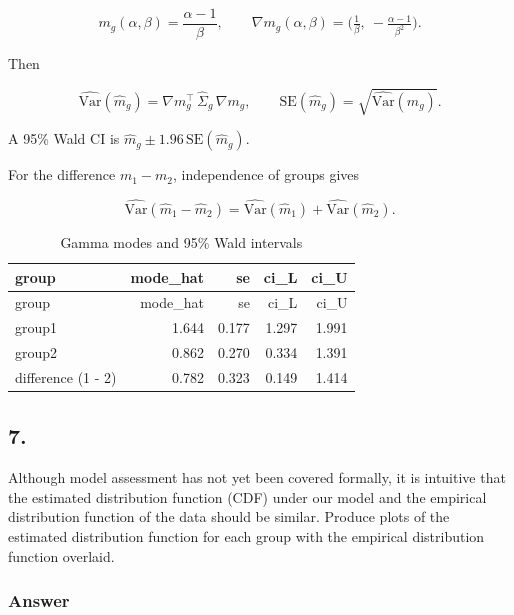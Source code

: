 \documentclass[
]{article}
\begin{document}
\[
m_g(\alpha,\beta)=\frac{\alpha-1}{\beta},\qquad 
\nabla m_g(\alpha,\beta)=\Big(\tfrac{1}{\beta},\ -\tfrac{\alpha-1}{\beta^2}\Big).
\]

Then

\[
\widehat{\mathrm{Var}}(\hat m_g)=\nabla m_g^\top\,\widehat\Sigma_g\,\nabla m_g,\qquad
\text{SE}(\hat m_g)=\sqrt{\widehat{\mathrm{Var}}(\hat m_g)}.
\]

A 95\% Wald CI is \(\hat m_g \pm 1.96\,\text{SE}(\hat m_g)\).

For the difference \(m_1-m_2\), independence of groups gives

\[
\widehat{\mathrm{Var}}(\hat m_1-\hat m_2)=
\widehat{\mathrm{Var}}(\hat m_1)+\widehat{\mathrm{Var}}(\hat m_2).
\]

\begin{longtable}[]{@{}lrrrr@{}}
\caption{Gamma modes and 95\% Wald intervals}\tabularnewline
\toprule\noalign{}
group & mode\_hat & se & ci\_L & ci\_U \\
\midrule\noalign{}
\endfirsthead
\toprule\noalign{}
group & mode\_hat & se & ci\_L & ci\_U \\
\midrule\noalign{}
\endhead
\bottomrule\noalign{}
\endlastfoot
group1 & 1.644 & 0.177 & 1.297 & 1.991 \\
group2 & 0.862 & 0.270 & 0.334 & 1.391 \\
difference (1 - 2) & 0.782 & 0.323 & 0.149 & 1.414 \\
\end{longtable}

\newpage

\subsection{7.}\label{section-6}

Although model assessment has not yet been covered formally, it is
intuitive that the estimated distribution function (CDF) under our model
and the empirical distribution function of the data should be similar.
Produce plots of the estimated distribution function for each group with
the empirical distribution function overlaid.

\subsubsection{Answer}\label{answer-6}
\end{document}
